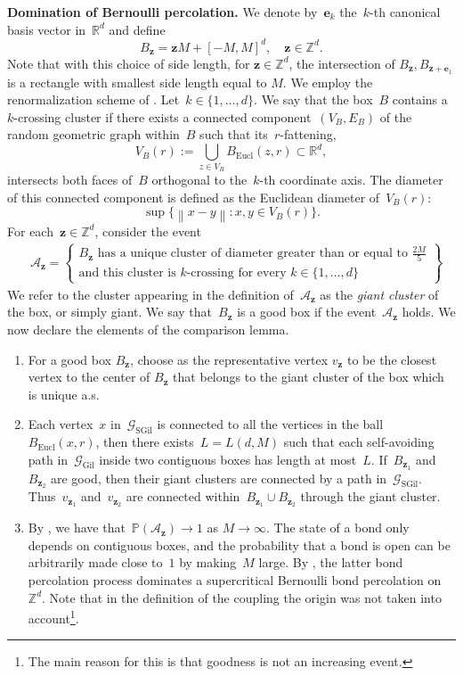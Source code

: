 \documentclass[a4paper,11pt]{article}
\newcommand{\RR}{\mathbb{R}}
\newcommand{\ZZ}{\mathbb{Z}}
\newcommand\norm[1]{\left\lVert#1\right\rVert}
\theoremstyle{definition}
\begin{document}
\noindent \textbf{Domination of Bernoulli percolation.} We denote by~$\mathbf{e}_k$ the~$k$-th canonical basis vector in~$\RR^d$ and define
$$ B_{\mathbf{z}} =\mathbf{z} M + [-M,M]^d, \quad \mathbf z \in \ZZ^d.$$
Note that with this choice of side length, for $\mathbf{z}\in \mathbb{Z}^d$, the intersection of $B_{\mathbf{z}}, B_{\mathbf{z}+\mathbf{e}_1}$ is a rectangle with smallest side length equal to $M$. We employ the renormalization scheme of \cite{FriedrichSauerwaldStauffer}. Let~$k \in \{1,\dots,d\}$. We say that the box~$B$ contains a~$k$-crossing cluster if there exists a connected component~$(V_B,E_B)$ of the random geometric graph within~$B$ such that its~$r$-fattening,
$$ V_B(r):= \bigcup_{z \in V_B } B_\mathrm{Eucl}(z,r) \subset \RR^d,$$
intersects both faces of~$B$ orthogonal to the~$k$-th coordinate axis. The diameter of this connected component is defined as the Euclidean diameter of~$V_B(r)$:
$$\sup\{\norm{x-y}: x,y \in V_B(r)\}.$$
For each~$\mathbf z \in \ZZ^d$, consider the event
\begin{align*}
    & \mathcal A_\mathbf{z} = \left\{ \begin{array}{c}
        B_\mathbf{z} \text{ has a unique cluster of diameter greater than or equal to } \frac{2M}{5} \\[1mm]
        \text{and this cluster is } k\text{-crossing for every } k \in \{1,\dots,d\}  
    \end{array} \right\}
\end{align*}
We refer to the cluster appearing in the definition of~$\mathcal A_{\mathbf z}$ as the \textit{giant cluster} of the box, or simply giant. We say that~$B_\mathbf{z}$ is a good box if the event~$\mathcal A_\mathbf{z}$ holds. We now declare the elements of the comparison lemma.
\begin{enumerate}
    \item For a good box $B_{\mathbf z}$, choose as the representative vertex $v_{\mathbf z}$ to be the closest vertex to the center of $B_{\mathbf z}$ that belongs to the giant cluster of the box which is unique a.s.
    \item Each vertex~$x$ in~$\mathcal G_\mathrm{SGil}$ is connected to all the vertices in the ball~$B_\mathrm{Eucl}(x,r)$, then there exists~$L = L(d,M)$ such that each self-avoiding path in~$\mathcal G_\mathrm{Gil}$ inside two contiguous boxes has length at most~$L$. If~$B_{\mathbf{z}_1}$ and~$B_{\mathbf{z}_2}$ are good, then their giant clusters are connected by a path in~$\mathcal G_\mathrm{SGil}$. Thus~$v_{\mathbf{z}_1}$ and~$v_{\mathbf z_2}$ are connected within~$B_{\mathbf{z}_1} \cup B_{\mathbf{z}_2}$ through the giant cluster.
    \item By \cite[Lemma 11]{FriedrichSauerwaldStauffer}, we have that~$\mathbb P(\mathcal A_{\mathbf{z}})\to 1$ as $M\to \infty$. The state of a bond only depends on contiguous boxes, and the probability that a bond is open can be arbitrarily made close to~$1$ by making~$M$ large. By \cite[Theorem~0.0]{liggettdomination}, the latter bond percolation process dominates a supercritical Bernoulli bond percolation on~$\mathbb Z^d$. Note that in the definition of the coupling the origin was not taken into account\footnote{The main reason for this is that goodness is not an increasing event.}.
\end{enumerate}
\end{document}
